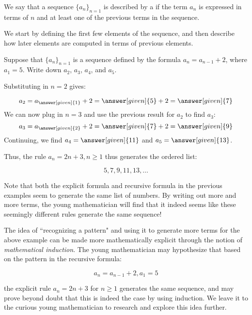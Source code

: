 \documentclass{ximera}
\begin{document}
\begin{definition}
We say that a sequence $\{a_n\}_{n=1}$ is described by a  if the term $a_n$ is expressed in terms of $n$ and at least one of the previous terms in the sequence.
\end{definition}

We start by defining the first few elements of the sequence, and then describe how later elements are computed in terms of previous elements.

\begin{example}
 Suppose that $\{a_n\}_{n=1}$ is a sequence defined by the formula $a_n = a_{n-1}+2$, where $a_1 = 5$.  Write down $a_2$, $a_3$, $a_4$, and $a_5$.
 
 \begin{explanation}
 Substituting in $n=2$ gives:
 
 \[
 a_2 = a_{\answer[given]{1}}+2 = \answer[given]{5}+2 = \answer[given]{7}
 \]
 We can now plug in $n=3$ and use the previous result for $a_2$ to find $a_3$:
  \[
 a_3 = a_{\answer[given]{2}}+2 = \answer[given]{7}+2 = \answer[given]{9}
 \]
 Continuing, we find $a_4 = \answer[given]{11}$ and $a_5 = \answer[given]{13}$.
 
 Thus, the rule $a_n = 2n+3, n \geq 1$ thus generates the ordered list:

\[
5,7,9,11,13, \dots
\]   

 \end{explanation}
\end{example}

Note that both the explicit formula and recursive formula in the previous examples seem to generate the same list of numbers.  By writing out more and more terms, the young mathematician will find that it indeed seems like these seemingly different rules generate the same sequence!  

  \begin{remark}
  The idea of ``recognizing a pattern" and using it to generate more terms for the above example can be made more mathematically explicit through the notion of \emph{mathematical induction}.  The young mathematician may hypothesize that based on the pattern in the recursive formula:
  
  \[
  a_n = a_{n-1}+2, a_1 = 5
  \]
  
  the explicit rule $a_n = 2n+3$ for $n \geq 1$ generates the same sequence, and may prove beyond doubt that this is indeed the case by using induction.  We leave it to the curious young mathematician to research and explore this idea further.
  \end{remark}
  
\end{document}
